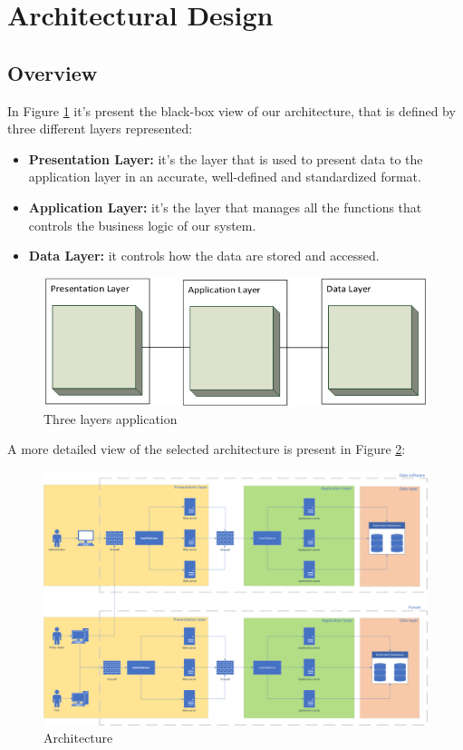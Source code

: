 \section{Architectural Design}
\subsection{Overview}
In Figure \ref{fig:three_layers_application} it's present the black-box view of our architecture, that is defined by three different layers represented:

\begin{itemize}
    \item \textbf{Presentation Layer:} it's the layer that is used to present data to the application layer in an accurate, well-defined and standardized format.
    \item \textbf{Application Layer:} it's the layer that manages all the functions that controls the business logic of our system.
    \item \textbf{Data Layer:} it controls how the data are stored and accessed.
\end{itemize}

\begin{figure}[h!]
        \centering
        \includegraphics[scale=0.6]{images/three_layers.png}
        \caption{Three layers application}
        \label{fig:three_layers_application}
\end{figure}
\FloatBarrier

A more detailed view of the selected architecture is present in Figure \ref{fig:architecture}:

\begin{figure}[h!]
        \centering
        \includegraphics[scale=0.25]{images/architecture_diagram.png}
        \caption{Architecture}
        \label{fig:architecture}
\end{figure}
\FloatBarrier

